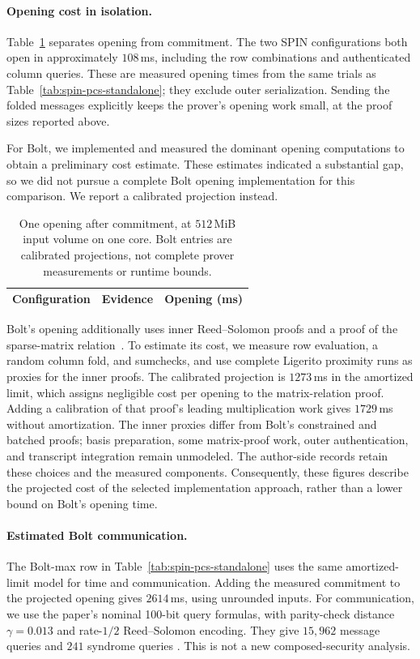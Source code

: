 \paragraph{Opening cost in isolation.}
Table~\ref{tab:pcs-opening} separates opening from commitment. The two
SPIN configurations both open in approximately $108$\,ms, including the
row combinations and authenticated column queries. These are measured
opening times from the same trials as Table~\ref{tab:spin-pcs-standalone};
they exclude outer serialization. Sending the folded messages explicitly
keeps the prover's opening work small, at the proof sizes reported above.

For Bolt, we implemented and measured the dominant opening computations
to obtain a preliminary cost estimate. These estimates indicated a
substantial gap, so we did not pursue a complete Bolt opening implementation
for this comparison. We report a calibrated projection instead.

\begin{table}[tb]
\centering
\caption{One opening after commitment, at $512$\,MiB input volume on one
core. Bolt entries are calibrated projections, not complete prover
measurements or runtime bounds.}
\label{tab:pcs-opening}
\small
\begin{tabular}{@{}llr@{}}
\toprule
Configuration & Evidence & Opening (ms) \\
\midrule

\end{tabular}
\end{table}

Bolt's opening additionally uses inner Reed--Solomon proofs and a proof
of the sparse-matrix relation~\cite{bolt26}. To estimate its cost, we
measure row evaluation, a random column fold, and sumchecks, and use
complete Ligerito proximity runs as proxies for the inner proofs. The
calibrated projection is $1273$\,ms in the amortized limit, which assigns
negligible cost per opening to the matrix-relation proof. Adding a
calibration of that proof's leading multiplication work gives $1729$\,ms
without amortization. The inner proxies differ from Bolt's constrained
and batched proofs; basis preparation, some matrix-proof work, outer
authentication, and transcript integration remain unmodeled. The
author-side records retain these choices and the measured components. Consequently,
these figures describe the projected cost of the selected implementation
approach, rather than a lower bound on Bolt's opening time.

\paragraph{Estimated Bolt communication.}
The Bolt-max row in Table~\ref{tab:spin-pcs-standalone} uses the same
amortized-limit model for time and communication. Adding the measured
commitment to the projected opening gives $2614$\,ms, using unrounded inputs.
For communication, we use the paper's nominal 100-bit query formulas,
with parity-check distance $\gamma=0.013$ and rate-$1/2$ Reed--Solomon
encoding. They give $15{,}962$ message queries and $241$ syndrome queries
\cite[Section 7.3]{bolt26}. This is not a new composed-security analysis.

